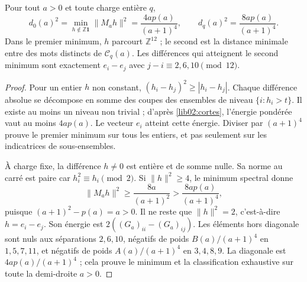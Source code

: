 \begin{theorem}
\label{lib02:distancias}
Pour tout \(a>0\) et toute charge entière \(q\),
\begin{equation}
 d_0(a)^2=\min_{h\notin\mathbb Z\mathbf1}\|M_ah\|^2
 =\frac{4ap(a)}{(a+1)^4},\qquad
 d_q(a)^2=\frac{8ap(a)}{(a+1)^4}.
 \label{lib02:distancias-exactas}
\end{equation}
Dans le premier minimum, \(h\) parcourt \(\mathbb Z^{12}\) ; le second
est la distance minimale entre des mots distincts de \(\mathcal C_q(a)\).
Les différences qui atteignent le second minimum sont exactement
\(e_i-e_j\) avec \(j-i\equiv2,6,10\pmod{12}\).
\end{theorem}
\begin{proof}
Pour un entier \(h\) non constant, \((h_i-h_j)^2\geq|h_i-h_j|\). Chaque différence absolue se décompose en somme des coupes des ensembles de niveau \(\{i:h_i>t\}\). Il existe au moins un niveau non trivial ; d'après \cref{lib02:cortes}, l'énergie pondérée vaut au moins \(4ap(a)\). Le vecteur \(e_i\) atteint cette énergie. Diviser par \((a+1)^4\) prouve le premier minimum sur tous les entiers, et pas seulement sur les indicatrices de sous-ensembles.

À charge fixe, la différence \(h\ne0\) est entière et de somme nulle.
Sa norme au carré est paire car \(h_i^2\equiv h_i\pmod2\). Si
\(\|h\|^2\geq4\), le minimum spectral donne
\[
 \|M_ah\|^2\geq\frac{8a}{(a+1)^2}
 >\frac{8ap(a)}{(a+1)^4},
\]
puisque \((a+1)^2-p(a)=a>0\). Il ne reste que
\(\|h\|^2=2\), c’est-à-dire \(h=e_i-e_j\). Son énergie est
\(2((G_a)_{ii}-(G_a)_{ij})\). Les éléments hors diagonale sont nuls
aux séparations \(2,6,10\), négatifs de poids \(B(a)/(a+1)^4\)
en \(1,5,7,11\), et négatifs de poids \(A(a)/(a+1)^4\) en
\(3,4,8,9\). La diagonale est \(4ap(a)/(a+1)^4\) ; cela prouve le
minimum et la classification exhaustive sur toute la demi-droite \(a>0\).
\end{proof}

